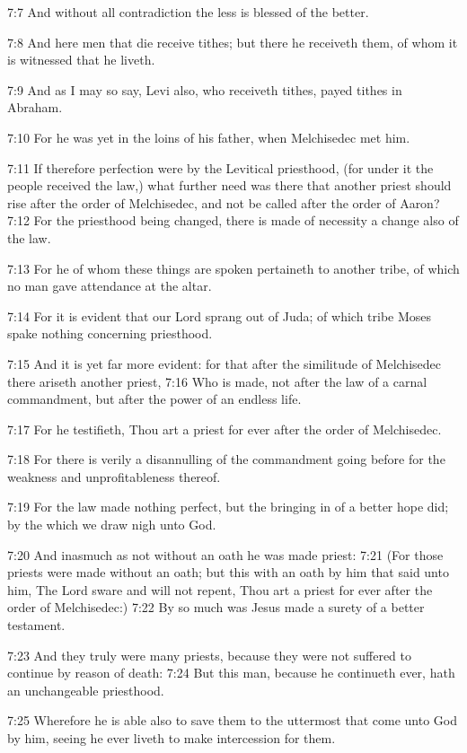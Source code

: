 7:7 And without all contradiction the less is blessed of the better.

7:8 And here men that die receive tithes; but there he receiveth them, of whom it is witnessed that he liveth.

7:9 And as I may so say, Levi also, who receiveth tithes, payed tithes in Abraham.

7:10 For he was yet in the loins of his father, when Melchisedec met him.

7:11 If therefore perfection were by the Levitical priesthood, (for under it the people received the law,) what further need was there that another priest should rise after the order of Melchisedec, and not be called after the order of Aaron?  7:12 For the priesthood being changed, there is made of necessity a change also of the law.

7:13 For he of whom these things are spoken pertaineth to another tribe, of which no man gave attendance at the altar.

7:14 For it is evident that our Lord sprang out of Juda; of which tribe Moses spake nothing concerning priesthood.

7:15 And it is yet far more evident: for that after the similitude of Melchisedec there ariseth another priest, 7:16 Who is made, not after the law of a carnal commandment, but after the power of an endless life.

7:17 For he testifieth, Thou art a priest for ever after the order of Melchisedec.

7:18 For there is verily a disannulling of the commandment going before for the weakness and unprofitableness thereof.

7:19 For the law made nothing perfect, but the bringing in of a better hope did; by the which we draw nigh unto God.

7:20 And inasmuch as not without an oath he was made priest: 7:21 (For those priests were made without an oath; but this with an oath by him that said unto him, The Lord sware and will not repent, Thou art a priest for ever after the order of Melchisedec:) 7:22 By so much was Jesus made a surety of a better testament.

7:23 And they truly were many priests, because they were not suffered to continue by reason of death: 7:24 But this man, because he continueth ever, hath an unchangeable priesthood.

7:25 Wherefore he is able also to save them to the uttermost that come unto God by him, seeing he ever liveth to make intercession for them.


